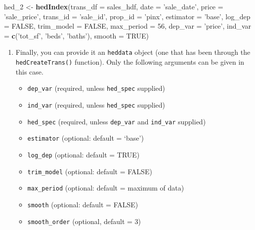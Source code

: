 \documentclass[]{article}
\newenvironment{Shaded}{\begin{snugshade}}{\end{snugshade}}
\newcommand{\DataTypeTok}[1]{\textcolor[rgb]{0.13,0.29,0.53}{#1}}
\newcommand{\DecValTok}[1]{\textcolor[rgb]{0.00,0.00,0.81}{#1}}
\newcommand{\KeywordTok}[1]{\textcolor[rgb]{0.13,0.29,0.53}{\textbf{#1}}}
\newcommand{\NormalTok}[1]{#1}
\newcommand{\OtherTok}[1]{\textcolor[rgb]{0.56,0.35,0.01}{#1}}
\newcommand{\StringTok}[1]{\textcolor[rgb]{0.31,0.60,0.02}{#1}}
\providecommand{\tightlist}{%
  \setlength{\itemsep}{0pt}\setlength{\parskip}{0pt}}
\begin{document}
\begin{Shaded}
\begin{Highlighting}[]
\NormalTok{  hed_}\DecValTok{2}\NormalTok{ <-}\StringTok{ }\KeywordTok{hedIndex}\NormalTok{(}\DataTypeTok{trans_df =}\NormalTok{ sales_hdf,}
                    \DataTypeTok{date =} \StringTok{'sale_date'}\NormalTok{,}
                    \DataTypeTok{price =} \StringTok{'sale_price'}\NormalTok{,}
                    \DataTypeTok{trans_id =} \StringTok{'sale_id'}\NormalTok{,}
                    \DataTypeTok{prop_id =} \StringTok{'pinx'}\NormalTok{,}
                    \DataTypeTok{estimator =} \StringTok{'base'}\NormalTok{,}
                    \DataTypeTok{log_dep =} \OtherTok{FALSE}\NormalTok{,}
                    \DataTypeTok{trim_model =} \OtherTok{FALSE}\NormalTok{,}
                    \DataTypeTok{max_period =} \DecValTok{56}\NormalTok{,}
                    \DataTypeTok{dep_var =} \StringTok{'price'}\NormalTok{,}
                    \DataTypeTok{ind_var =} \KeywordTok{c}\NormalTok{(}\StringTok{'tot_sf'}\NormalTok{, }\StringTok{'beds'}\NormalTok{, }\StringTok{'baths'}\NormalTok{),}
                    \DataTypeTok{smooth =} \OtherTok{TRUE}\NormalTok{)}
\end{Highlighting}
\end{Shaded}

\begin{enumerate}
\def\labelenumi{\arabic{enumi}.}
\setcounter{enumi}{2}
\item
  Finally, you can provide it an \texttt{heddata} object (one that has
  been through the \texttt{hedCreateTrans()} function). Only the
  following arguments can be given in this case.

  \begin{itemize}
  \tightlist
  \item
    \texttt{dep\_var} (required, unless \texttt{hed\_spec} supplied)
  \item
    \texttt{ind\_var} (required, unless \texttt{hed\_spec} supplied)
  \item
    \texttt{hed\_spec} (required, unless \texttt{dep\_var} and
    \texttt{ind\_var} supplied)
  \item
    \texttt{estimator} (optional: default = `base')
  \item
    \texttt{log\_dep} (optional: default = TRUE)
  \item
    \texttt{trim\_model} (optional: default = FALSE)
  \item
    \texttt{max\_period} (optional: default = maximum of data)
  \item
    \texttt{smooth} (optional: default = FALSE)
  \item
    \texttt{smooth\_order} (optional, default = 3)
  \end{itemize}
\end{enumerate}
\end{document}
